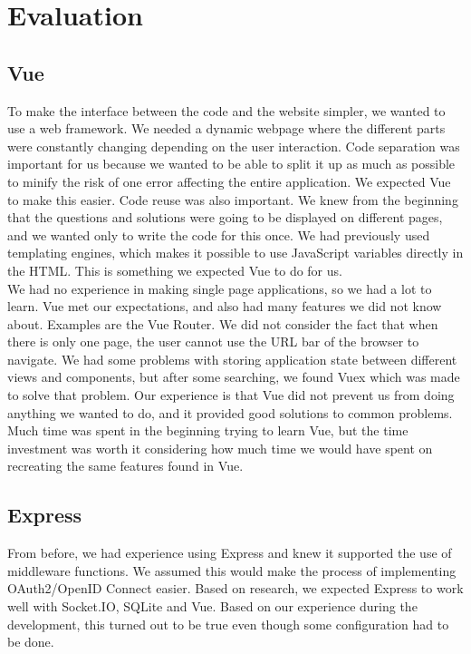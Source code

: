 \section{Evaluation}
\subsection{Vue}
To make the interface between the code and the website simpler, we wanted to use a web framework. We needed a dynamic webpage where the different parts were constantly changing depending on the user interaction. Code separation was important for us because we wanted to be able to split it up as much as possible to minify the risk of one error affecting the entire application. We expected Vue to make this easier. Code reuse was also important. We knew from the beginning that the questions and solutions were going to be displayed on different pages, and we wanted only to write the code for this once. We had previously used templating engines, which makes it possible to use JavaScript variables directly in the HTML. This is something we expected Vue to do for us.
\\[11pt]
We had no experience in making single page applications, so we had a lot to learn. Vue met our expectations, and also had many features we did not know about. Examples are the Vue Router. We did not consider the fact that when there is only one page, the user cannot use the URL bar of the browser to navigate. We had some problems with storing application state between different views and components, but after some searching, we found Vuex which was made to solve that problem. Our experience is that Vue did not prevent us from doing anything we wanted to do, and it provided good solutions to common problems. Much time was spent in the beginning trying to learn Vue, but the time investment was worth it considering how much time we would have spent on recreating the same features found in Vue.

\subsection{Express}
From before, we had experience using Express and knew it supported the use of middleware functions. We assumed this would make the process of implementing OAuth2/OpenID Connect easier. Based on research, we expected Express to work well with Socket.IO, SQLite and Vue. Based on our experience during the development, this turned out to be true even though some configuration had to be done.

